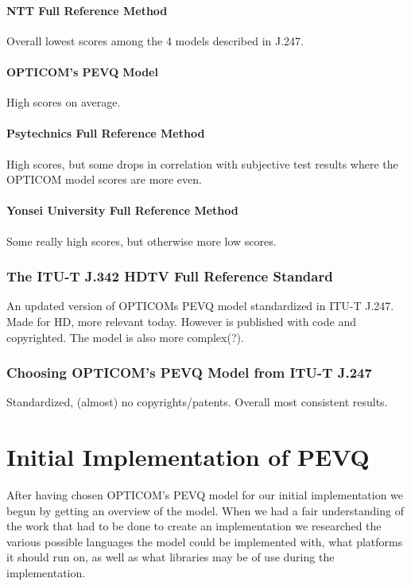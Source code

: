 \subsubsection{NTT Full Reference Method}
Overall lowest scores among the 4 models described in J.247.

\subsubsection{OPTICOM's PEVQ Model}
High scores on average. 

\subsubsection{Psytechnics Full Reference Method}
High scores, but some drops in correlation with subjective test results where the OPTICOM model scores are more even.


\subsubsection{Yonsei University Full Reference Method}
Some really high scores, but otherwise more low scores.

\subsection{The ITU-T J.342 HDTV Full Reference Standard}
An updated version of OPTICOMs PEVQ model standardized in ITU-T J.247. Made for HD, more relevant today. However is published with code and copyrighted. The model is also more complex(?).

\subsection{Choosing OPTICOM's PEVQ Model from ITU-T J.247}
Standardized, (almost) no copyrights/patents. Overall most consistent results.

\chapter{Initial Implementation of PEVQ}
After having chosen OPTICOM's PEVQ model for our initial implementation we begun by getting an overview of the model. When we had a fair understanding of the work that had to be done to create an implementation we researched the various possible languages the model could be implemented with, what platforms it should run on, as well as what libraries may be of use during the implementation.

